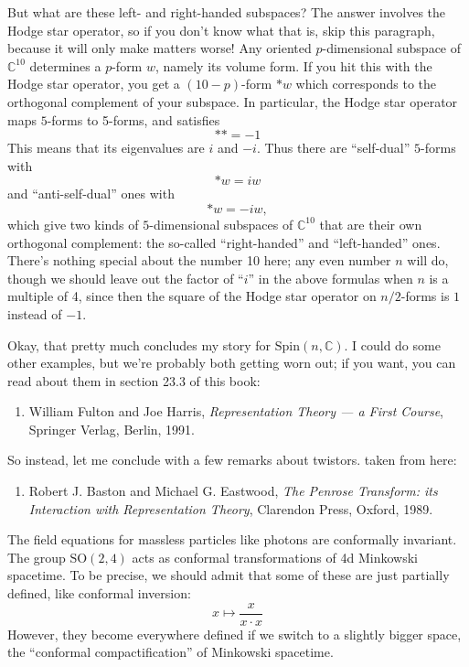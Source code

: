 \documentclass{article}
\def\tightlist{}
\begin{document}
But what are these left- and right-handed subspaces? The answer involves
the Hodge star operator, so if you don't know what that is, skip this
paragraph, because it will only make matters worse! Any oriented
\(p\)-dimensional subspace of \(\mathbb{C}^{10}\) determines a
\(p\)-form \(w\), namely its volume form. If you hit this with the Hodge
star operator, you get a \((10-p)\)-form \(*w\) which corresponds to the
orthogonal complement of your subspace. In particular, the Hodge star
operator maps \(5\)-forms to 5-forms, and satisfies \[** = -1\] This
means that its eigenvalues are \(i\) and \(-i\). Thus there are
``self-dual'' \(5\)-forms with \[*w = iw\] and ``anti-self-dual'' ones
with \[*w = -iw,\] which give two kinds of \(5\)-dimensional subspaces
of \(\mathbb{C}^{10}\) that are their own orthogonal complement: the
so-called ``right-handed'' and ``left-handed'' ones. There's nothing
special about the number 10 here; any even number \(n\) will do, though
we should leave out the factor of ``\(i\)'' in the above formulas when
\(n\) is a multiple of 4, since then the square of the Hodge star
operator on \(n/2\)-forms is \(1\) instead of \(-1\).

Okay, that pretty much concludes my story for
\(\mathrm{Spin}(n,\mathbb{C})\). I could do some other examples, but
we're probably both getting worn out; if you want, you can read about
them in section 23.3 of this book:

\begin{enumerate}
\def\labelenumi{\arabic{enumi})}
\setcounter{enumi}{4}
\tightlist
\item
  William Fulton and Joe Harris, \emph{Representation Theory --- a First
  Course}, Springer Verlag, Berlin, 1991.
\end{enumerate}

So instead, let me conclude with a few remarks about twistors. taken
from here:

\begin{enumerate}
\def\labelenumi{\arabic{enumi})}
\setcounter{enumi}{5}
\tightlist
\item
  Robert J. Baston and Michael G. Eastwood, \emph{The Penrose Transform:
  its Interaction with Representation Theory}, Clarendon Press, Oxford,
  1989.
\end{enumerate}

The field equations for massless particles like photons are conformally
invariant. The group \(\mathrm{SO}(2,4)\) acts as conformal
transformations of 4d Minkowski spacetime. To be precise, we should
admit that some of these are just partially defined, like conformal
inversion: \[x \mapsto \frac{x}{x\cdot x}\] However, they become
everywhere defined if we switch to a slightly bigger space, the
``conformal compactification'' of Minkowski spacetime.
\end{document}

